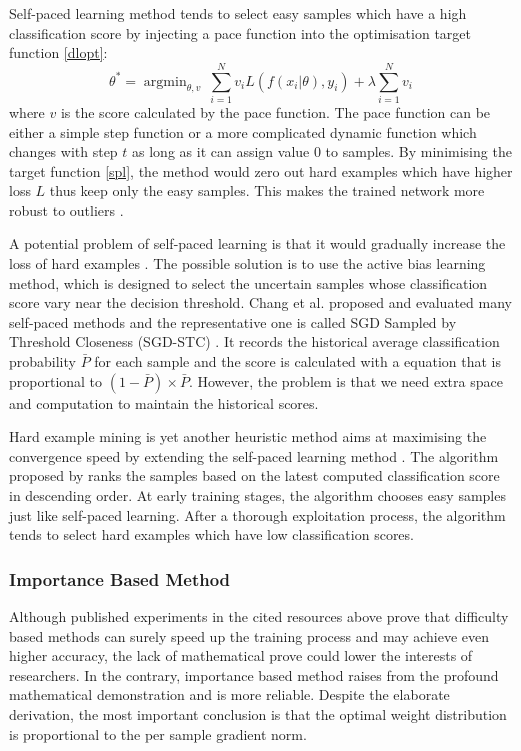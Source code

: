 Self-paced learning method tends to select easy samples which have a high classification score by injecting a pace function into the optimisation target function \ref{dlopt}:
\begin{equation}
\label{spl}
\theta^* = \mathop{\arg\min}_{\theta, v}\ \sum^{N}_{i=1} v_iL(f(x_i|\theta), y_i) + \lambda \sum^{N}_{i=1}  v_i
\end{equation}
where $v$ is the score calculated by the pace function. The pace function can be either a simple step function \cite{Kumar2010} or a more complicated dynamic function which changes with step $t$ \cite{Li2017} as long as it can assign value 0 to samples. By minimising the target function \ref{spl}, the method would zero out hard examples which have higher loss $L$ thus keep only the easy samples. This makes the trained network more robust to outliers \cite{Meng2016}. 

A potential problem of self-paced learning is that it would gradually increase the loss of hard examples \cite{Chang2017}. The possible solution is to use the active bias learning method, which is designed to select the uncertain samples whose classification score vary near the decision threshold. Chang et al. proposed and evaluated many self-paced methods and the representative one is called SGD Sampled by Threshold Closeness (SGD-STC) \cite{Chang2017}. It records the historical average classification probability $\bar{P}$ for each sample and the score is calculated with a equation that is proportional to $(1-\bar{P}) \times \bar{P}$. However, the problem is that we need extra space and computation to maintain the historical scores.

Hard example mining is yet another heuristic method aims at maximising the convergence speed by extending the self-paced learning method \cite{Shrivastava2016}. The algorithm proposed by \cite{Loshchilov2015} ranks the samples based on the latest computed classification score in descending order. At early training stages, the algorithm chooses easy samples just like self-paced learning. After a thorough exploitation process, the algorithm tends to select hard examples which have low classification scores.



\subsubsection{Importance Based Method}
\label{ibalgorithm}
Although published experiments in the cited resources above prove that difficulty based methods can surely speed up the training process and may achieve even higher accuracy, the lack of mathematical prove could lower the interests of researchers. In the contrary, importance based method raises from the profound mathematical demonstration \cite{Zhao2015} and is more reliable. Despite the elaborate derivation, the most important conclusion is that the optimal weight distribution is proportional to the per sample gradient norm.

